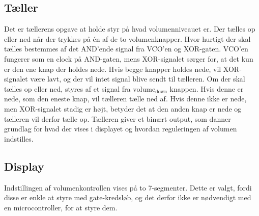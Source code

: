 \subsection*{Tæller}
\label{volumenkontrol-simulering-taeller}

Det er tællerens opgave at holde styr på hvad volumenniveauet er. Der tælles op eller ned når der trykkes på én af de to volumenknapper. Hvor hurtigt der skal tælles bestemmes af det AND'ende signal fra VCO'en og XOR-gaten. VCO'en fungerer som en clock på AND-gaten, mens XOR-signalet sørger for, at det kun er den ene knap der holdes nede. Hvis begge knapper holdes nede, vil XOR-signalet være lavt, og der vil intet signal blive sendt til tælleren. Om der skal tælles op eller ned, styres af et signal fra $\mathrm{volume_{down}}$ knappen. Hvis denne er nede, som den eneste knap, vil tælleren tælle ned af. Hvis denne ikke er nede, men XOR-signalet stadig er højt, betyder det at den anden knap er nede og tælleren vil derfor tælle op. Tælleren giver et binært output, som danner grundlag for hvad der vises i displayet og hvordan reguleringen af volumen indstilles.

\subsection*{Display}
\label{volumenkontrol-simulering-display}
Indstillingen af volumenkontrollen vises på to 7-segmenter. Dette er valgt, fordi disse er enkle at styre med gate-kredsløb, og det derfor ikke er nødvendigt med en microcontroller, for at styre dem. 

